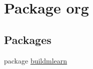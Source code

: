 \hypertarget{namespaceorg}{}\section{Package org}
\label{namespaceorg}
\subsection*{Packages}
\begin{DoxyCompactItemize}
\item 
package \hyperlink{namespaceorg_1_1buildmlearn}{buildmlearn}
\end{DoxyCompactItemize}
